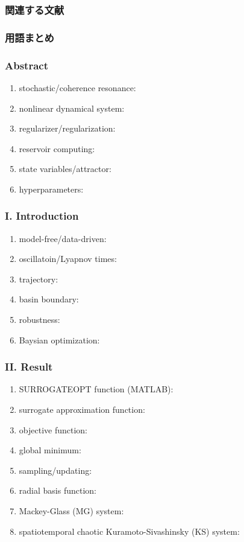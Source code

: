 \subsubsection{関連する文献}
 
\clearpage
\subsubsection{用語まとめ}

\subsubsection{Abstract}
\begin{enumerate}
  \item stochastic/coherence resonance: 
  \item nonlinear dynamical system:
  \item regularizer/regularization:
  \item reservoir computing:
  \item state variables/attractor:
  \item hyperparameters:
\end{enumerate}
\subsubsection{I. Introduction}
\begin{enumerate}
  \item model-free/data-driven:
  \item oscillatoin/Lyapnov times:
  \item trajectory:
  \item basin boundary: 
  \item robustness:
  \item Baysian optimization:
\end{enumerate}

\subsubsection{II. Result}
\begin{enumerate}
  \item SURROGATEOPT function (MATLAB):
  \item surrogate approximation function:
  \item objective function:
  \item global minimum:
  \item sampling/updating:
  \item radial basis function: 
  \item Mackey-Glass (MG) system:
  \item spatiotemporal chaotic Kuramoto-Sivashinsky (KS) system: 
\end{enumerate}

